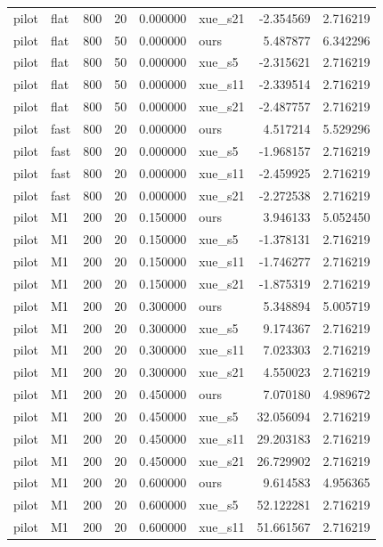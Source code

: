 \begin{longtable}{llrrrlrr}
pilot & flat & 800 & 20 & 0.000000 & xue\_s21 & -2.354569 & 2.716219 \\
pilot & flat & 800 & 50 & 0.000000 & ours & 5.487877 & 6.342296 \\
pilot & flat & 800 & 50 & 0.000000 & xue\_s5 & -2.315621 & 2.716219 \\
pilot & flat & 800 & 50 & 0.000000 & xue\_s11 & -2.339514 & 2.716219 \\
pilot & flat & 800 & 50 & 0.000000 & xue\_s21 & -2.487757 & 2.716219 \\
pilot & fast & 800 & 20 & 0.000000 & ours & 4.517214 & 5.529296 \\
pilot & fast & 800 & 20 & 0.000000 & xue\_s5 & -1.968157 & 2.716219 \\
pilot & fast & 800 & 20 & 0.000000 & xue\_s11 & -2.459925 & 2.716219 \\
pilot & fast & 800 & 20 & 0.000000 & xue\_s21 & -2.272538 & 2.716219 \\
pilot & M1 & 200 & 20 & 0.150000 & ours & 3.946133 & 5.052450 \\
pilot & M1 & 200 & 20 & 0.150000 & xue\_s5 & -1.378131 & 2.716219 \\
pilot & M1 & 200 & 20 & 0.150000 & xue\_s11 & -1.746277 & 2.716219 \\
pilot & M1 & 200 & 20 & 0.150000 & xue\_s21 & -1.875319 & 2.716219 \\
pilot & M1 & 200 & 20 & 0.300000 & ours & 5.348894 & 5.005719 \\
pilot & M1 & 200 & 20 & 0.300000 & xue\_s5 & 9.174367 & 2.716219 \\
pilot & M1 & 200 & 20 & 0.300000 & xue\_s11 & 7.023303 & 2.716219 \\
pilot & M1 & 200 & 20 & 0.300000 & xue\_s21 & 4.550023 & 2.716219 \\
pilot & M1 & 200 & 20 & 0.450000 & ours & 7.070180 & 4.989672 \\
pilot & M1 & 200 & 20 & 0.450000 & xue\_s5 & 32.056094 & 2.716219 \\
pilot & M1 & 200 & 20 & 0.450000 & xue\_s11 & 29.203183 & 2.716219 \\
pilot & M1 & 200 & 20 & 0.450000 & xue\_s21 & 26.729902 & 2.716219 \\
pilot & M1 & 200 & 20 & 0.600000 & ours & 9.614583 & 4.956365 \\
pilot & M1 & 200 & 20 & 0.600000 & xue\_s5 & 52.122281 & 2.716219 \\
pilot & M1 & 200 & 20 & 0.600000 & xue\_s11 & 51.661567 & 2.716219 \\

\end{longtable}
